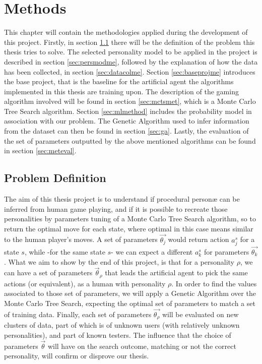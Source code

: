 \chapter{Methods}
This chapter will contain the methodologies applied during the development of this project. Firstly, in section \ref{sec:defprob} there will be the definition of the problem this thesis tries to solve. The selected personality model to be applied in the project is described in section \ref{sec:persmodme}, followed by the explanation of how the data has been collected, in section \ref{sec:datacolme}. Section \ref{sec:baseprojme} introduces the base project, that is the baseline for the artificial agent the algorithms implemented in this thesis are training upon. The description of the gaming algorithm involved will be found in section \ref{sec:mctsmet}, which is a Monte Carlo Tree Search algorithm. Section \ref{sec:mlmethod} includes the probability model in association with our problem. The Genetic Algorithm used to infer information from the dataset can then be found in section \ref{sec:ga}. Lastly, the evaluation of the set of parameters outputted by the above mentioned algorithms can be found in section \ref{sec:meteval}.
\section{Problem Definition}\label{sec:defprob}
The aim of this thesis project is to understand if procedural personæ can be inferred from human game playing, and if it is possible to recreate those personalities by parameters tuning of a Monte Carlo Tree Search algorithm, so to return the optimal move for each state, where optimal in this case means similar to the human player's moves. A set of parameters $\vec{\theta_j}$ would return action $a_j^s$ for a state $s$, while -for the same state $s$- we can expect a different $a_k^s$ for parameters $\vec{\theta_k}$. What we aim to show by the end of this project, is that for a personality $\rho$, we can have a set of parameters $\vec{\theta}_\rho$ that leads the artificial agent to pick the same actions (or equivalent), as a human with personality $\rho$. In order to find the values associated to those set of parameters, we will apply a Genetic Algorithm over the Monte Carlo Tree Search, expecting the optimal set of parameters to match a set of training data.
Finally, each set of parameters $\vec{\theta_\rho}$ will be evaluated on new clusters of data, part of which is of unknown users (with relatively unknown personalities), and part of known testers. The influence that the choice of parameters $\vec{\theta}$ will have on the search outcome, matching or not the correct personality, will confirm or disprove our thesis.
